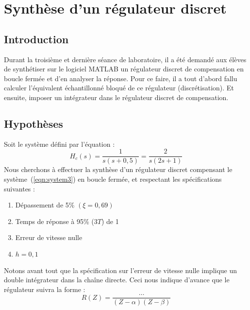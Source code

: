 \chapter{Synthèse d'un régulateur discret}

\section{Introduction}
Durant la troisième et dernière séance de laboratoire, il a été demandé aux élèves de synthétiser sur le logiciel MATLAB\textregistered{} un régulateur discret de compensation en boucle fermée et d'en analyser la réponse.
Pour ce faire, il a tout d'abord fallu calculer l'équivalent échantillonné bloqué de ce régulateur (discrétisation).
Et ensuite, imposer un intégrateur dans le régulateur discret de compensation.

\section{Hypothèses}
Soit le système défini par l'équation :
\begin{equation}
	H_c(s) = \frac{1}{s\left( s+0,5\right)}
		   = \frac{2}{s\left(2s+1  \right)}
	\label{eqn:system3}
\end{equation}
Nous cherchons à effectuer la synthèse d'un régulateur discret compensant le système~(\ref{eqn:system3}) en boucle fermée, et respectant les spécifications suivantes :
\begin{enumerate}
	\item Dépassement de 5\% $(\xi=0,69)$
	\item Temps de réponse à 95\% ($3T$) de 1
	\item Erreur de vitesse nulle
	\item $h = 0,1$
\end{enumerate}
Notons avant tout que la spécification sur l'erreur de vitesse nulle implique un double intégrateur dans la chaîne directe.
Ceci nous indique d'avance que le régulateur suivra la forme :
\begin{equation}
	R(Z) = \frac{\dots}{(Z-\alpha)(Z-\beta)}
\end{equation}

